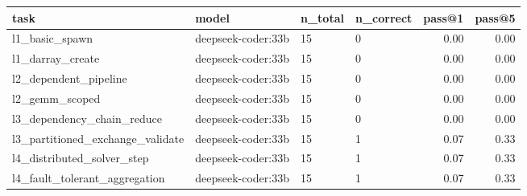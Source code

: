 \begin{tabular}{llllrr}
\hline
task & model & n_total & n_correct & pass@1 & pass@5 \\
\hline
l1_basic_spawn & deepseek-coder:33b & 15 & 0 & 0.00 & 0.00 \\
l1_darray_create & deepseek-coder:33b & 15 & 0 & 0.00 & 0.00 \\
l2_dependent_pipeline & deepseek-coder:33b & 15 & 0 & 0.00 & 0.00 \\
l2_gemm_scoped & deepseek-coder:33b & 15 & 0 & 0.00 & 0.00 \\
l3_dependency_chain_reduce & deepseek-coder:33b & 15 & 0 & 0.00 & 0.00 \\
l3_partitioned_exchange_validate & deepseek-coder:33b & 15 & 1 & 0.07 & 0.33 \\
l4_distributed_solver_step & deepseek-coder:33b & 15 & 1 & 0.07 & 0.33 \\
l4_fault_tolerant_aggregation & deepseek-coder:33b & 15 & 1 & 0.07 & 0.33 \\
\hline
\end{tabular}
